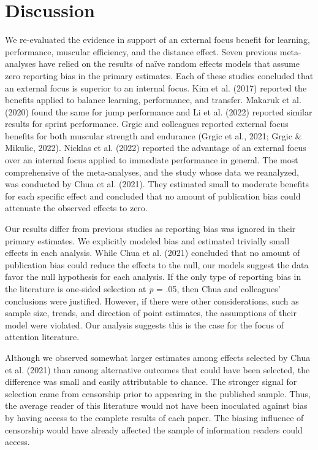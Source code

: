 \documentclass[
  11pt,
  doc, donotrepeattitle,floatsintext]{apa7}
\begin{document}
\clearpage

\hypertarget{discussion}{%
\section{Discussion}\label{discussion}}

We re-evaluated the evidence in support of an external focus benefit for learning, performance, muscular efficiency, and the distance effect. Seven previous meta-analyses have relied on the results of naïve random effects models that assume zero reporting bias in the primary estimates. Each of these studies concluded that an external focus is superior to an internal focus. Kim et al. (2017) reported the benefits applied to balance learning, performance, and transfer. Makaruk et al. (2020) found the same for jump performance and Li et al. (2022) reported similar results for sprint performance. Grgic and colleagues reported external focus benefits for both muscular strength and endurance (Grgic et al., 2021; Grgic \& Mikulic, 2022). Nicklas et al. (2022) reported the advantage of an external focus over an internal focus applied to immediate performance in general. The most comprehensive of the meta-analyses, and the study whose data we reanalyzed, was conducted by Chua et al. (2021). They estimated small to moderate benefits for each specific effect and concluded that no amount of publication bias could attenuate the observed effects to zero.

Our results differ from previous studies as reporting bias was ignored in their primary estimates. We explicitly modeled bias and estimated trivially small effects in each analysis. While Chua et al. (2021) concluded that no amount of publication bias could reduce the effects to the null, our models suggest the data favor the null hypothesis for each analysis. If the only type of reporting bias in the literature is one-sided selection at \emph{p} = .05, then Chua and colleagues' conclusions were justified. However, if there were other considerations, such as sample size, trends, and direction of point estimates, the assumptions of their model were violated. Our analysis suggests this is the case for the focus of attention literature.

Although we observed somewhat larger estimates among effects selected by Chua et al. (2021) than among alternative outcomes that could have been selected, the difference was small and easily attributable to chance. The stronger signal for selection came from censorship prior to appearing in the published sample. Thus, the average reader of this literature would not have been inoculated against bias by having access to the complete results of each paper. The biasing influence of censorship would have already affected the sample of information readers could access.
\end{document}
